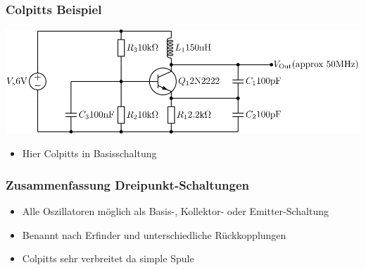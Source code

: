 \begin{frame}
  \frametitle{Colpitts Beispiel}
  \begin{center}
    \includegraphics[width=1\textwidth,height=.6\textheight,keepaspectratio]{a07/NPN_Colpitts_oscillator_collector_coil.png} \\[1em]
    \begin{itemize}
      \item Hier Colpitts in Basisschaltung
    \end{itemize}
  \end{center}
\end{frame}

\begin{frame}
  \frametitle{Zusammenfassung Dreipunkt-Schaltungen}
  \begin{itemize}
    \item Alle Oszillatoren möglich als Basis-, Kollektor- oder Emitter-Schaltung
    \item Benannt nach Erfinder und unterschiedliche Rückkopplungen
    \item Colpitts sehr verbreitet da simple Spule
  \end{itemize}
\end{frame}

